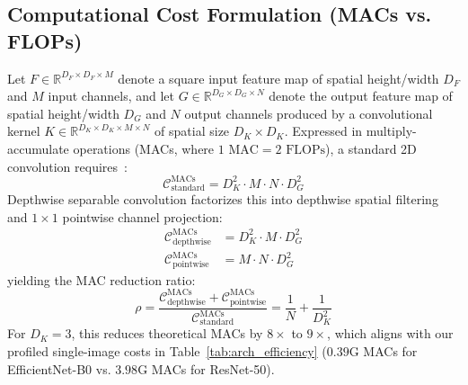 \documentclass[journal]{IEEEtran}
\begin{document}
\subsection{Computational Cost Formulation (MACs vs. FLOPs)}
Let $F \in \mathbb{R}^{D_F \times D_F \times M}$ denote a square input feature map of spatial height/width $D_F$ and $M$ input channels, and let $G \in \mathbb{R}^{D_G \times D_G \times N}$ denote the output feature map of spatial height/width $D_G$ and $N$ output channels produced by a convolutional kernel $K \in \mathbb{R}^{D_K \times D_K \times M \times N}$ of spatial size $D_K \times D_K$. Expressed in multiply-accumulate operations (MACs, where $1\text{ MAC} = 2\text{ FLOPs}$), a standard 2D convolution requires~\cite{howard2017}:
\begin{equation}
\mathcal{C}_{\text{standard}}^{\text{MACs}} = D_K^2 \cdot M \cdot N \cdot D_G^2
\end{equation}
Depthwise separable convolution factorizes this into depthwise spatial filtering and $1\times 1$ pointwise channel projection:
\begin{align}
\mathcal{C}_{\text{depthwise}}^{\text{MACs}} &= D_K^2 \cdot M \cdot D_G^2 \\
\mathcal{C}_{\text{pointwise}}^{\text{MACs}} &= M \cdot N \cdot D_G^2
\end{align}
yielding the MAC reduction ratio:
\begin{equation}
\rho = \frac{\mathcal{C}_{\text{depthwise}}^{\text{MACs}} + \mathcal{C}_{\text{pointwise}}^{\text{MACs}}}{\mathcal{C}_{\text{standard}}^{\text{MACs}}} = \frac{1}{N} + \frac{1}{D_K^2}
\end{equation}
For $D_K = 3$, this reduces theoretical MACs by $8\times$ to $9\times$, which aligns with our profiled single-image costs in Table~\ref{tab:arch_efficiency} ($0.39\text{G}$ MACs for EfficientNet-B0 vs. $3.98\text{G}$ MACs for ResNet-50).
\end{document}

